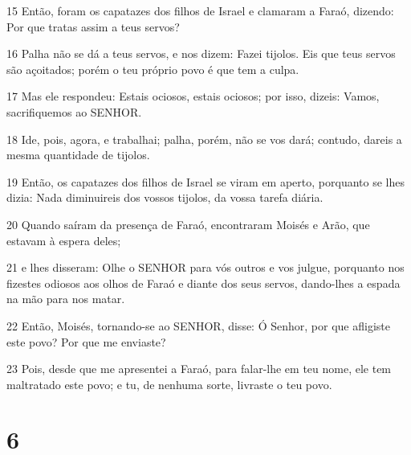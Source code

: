 \par 15 Então, foram os capatazes dos filhos de Israel e clamaram a Faraó, dizendo: Por que tratas assim a teus servos?
\par 16 Palha não se dá a teus servos, e nos dizem: Fazei tijolos. Eis que teus servos são açoitados; porém o teu próprio povo é que tem a culpa.
\par 17 Mas ele respondeu: Estais ociosos, estais ociosos; por isso, dizeis: Vamos, sacrifiquemos ao SENHOR.
\par 18 Ide, pois, agora, e trabalhai; palha, porém, não se vos dará; contudo, dareis a mesma quantidade de tijolos.
\par 19 Então, os capatazes dos filhos de Israel se viram em aperto, porquanto se lhes dizia: Nada diminuireis dos vossos tijolos, da vossa tarefa diária.
\par 20 Quando saíram da presença de Faraó, encontraram Moisés e Arão, que estavam à espera deles;
\par 21 e lhes disseram: Olhe o SENHOR para vós outros e vos julgue, porquanto nos fizestes odiosos aos olhos de Faraó e diante dos seus servos, dando-lhes a espada na mão para nos matar.
\par 22 Então, Moisés, tornando-se ao SENHOR, disse: Ó Senhor, por que afligiste este povo? Por que me enviaste?
\par 23 Pois, desde que me apresentei a Faraó, para falar-lhe em teu nome, ele tem maltratado este povo; e tu, de nenhuma sorte, livraste o teu povo.

\chapter{6}

